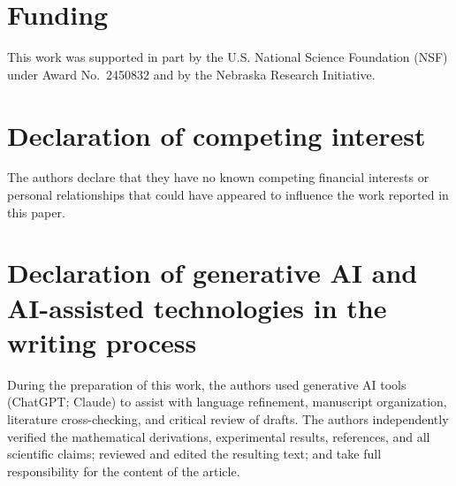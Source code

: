 \documentclass[twocolumn,3p,times,procedia]{elsarticle}
\begin{document}
\section*{Funding}
This work was supported in part by the U.S. National Science Foundation
(NSF) under Award No.~2450832 and by the Nebraska Research Initiative.

\section*{Declaration of competing interest}
The authors declare that they have no known competing financial
interests or personal relationships that could have appeared to
influence the work reported in this paper.

\section*{Declaration of generative AI and AI-assisted technologies
in the writing process}
During the preparation of this work, the authors used generative AI
tools (ChatGPT; Claude) to assist with language refinement, manuscript
organization, literature cross-checking, and critical review of drafts.
The authors independently verified the mathematical derivations,
experimental results, references, and all scientific claims; reviewed
and edited the resulting text; and take full responsibility for the
content of the article.
\end{document}
